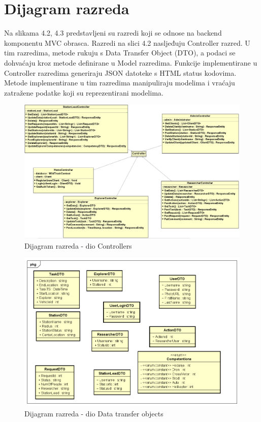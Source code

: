 			\eject
			
			
		\section{Dijagram razreda}
		
			Na slikama 4.2, 4.3 predstavljeni su razredi koji se odnose na backend komponentu MVC obrasca. Razredi na slici 4.2 nasljeđuju Controller razred. U tim razredima, metode rukuju s Data Transfer Object (DTO), a podaci se dohvaćaju kroz metode definirane u Model razredima. Funkcije implementirane u Controller razredima generiraju JSON datoteke s HTML status kodovima. Metode implementirane u tim razredima manipuliraju modelima i vraćaju zatražene podatke koji su reprezentirani modelima.
			
			\vspace{90pt}
			
			
			\begin{figure}[H]
				\centering
				\includegraphics[width=\textwidth]{slike/Controlleri.PNG}
				\caption{Dijagram razreda - dio Controllers}
				\label{fig:dijagram_baze}
			\end{figure}
			
			
			\begin{figure}[H]
				\includegraphics[width=\textwidth]{slike/Class_Diagram0.PNG} %
				\caption{Dijagram razreda - dio Data transfer objects}
				\label{fig:dijagram_baze} %
			\end{figure}
			
